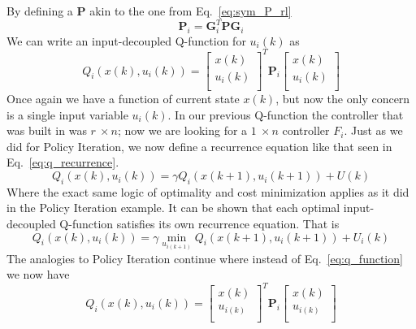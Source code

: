 By defining a \textbf{P} akin to the one from Eq.~\ref{eq:sym_P_rl}
\begin{equation}
    \textbf{P}_i=\textbf{G}_i^T\textbf{P}\textbf{G}_i
    \label{eq:P_id}
\end{equation}
We can write an input-decoupled Q-function for $u_i\left(k\right)$ as
\begin{equation}
    Q_i\left(x\left(k\right),u_i\left(k\right)\right)={\left[\begin{matrix}x\left(k\right)\\u_i\left(k\right)\\\end{matrix}\right]}^T\textbf{P}_i\left[\begin{matrix}x\left(k\right)\\u_i\left(k\right)\\\end{matrix}\right]
    \label{eq:id_q_function}
\end{equation}
Once again we have a function of current state $x\left(k\right)$, but now the only concern is a single input variable $u_i\left(k\right)$. In our previous Q-function the controller that was built in was $r\ \times n$; now we are looking for a $1\ \times n$ controller $F_i$.
Just as we did for Policy Iteration, we now define a recurrence equation like that seen in Eq.~\ref{eq:q_recurrence}.
\begin{equation}
    Q_i\left(x\left(k\right),u_i\left(k\right)\right)=\gamma Q_i\left(x\left(k+1\right),u_i\left(k+1\right)\right)+U\left(k\right)
\end{equation}
Where the exact same logic of optimality and cost minimization applies as it did in the Policy Iteration example. It can be shown that each optimal input-decoupled Q-function satisfies its own recurrence equation. That is
\begin{equation}
    Q_i\left(x\left(k\right),u_i\left(k\right)\right)=\gamma \min_{u_{i\left(k+1\right)}} Q_i\left(x\left(k+1\right),u_i\left(k+1\right)\right)+U_i\left(k\right)
\end{equation}
The analogies to Policy Iteration continue where instead of Eq.~\ref{eq:q_function} we now have
\begin{equation}
    Q_i\left(x\left(k\right),u_i\left(k\right)\right)={\left[\begin{matrix}x\left(k\right)\\u_{i\left(k\right)}\\\end{matrix}\right]}^T\textbf{P}_i\left[\begin{matrix}x\left(k\right)\\u_{i\left(k\right)}\\\end{matrix}\right] 
\end{equation}
